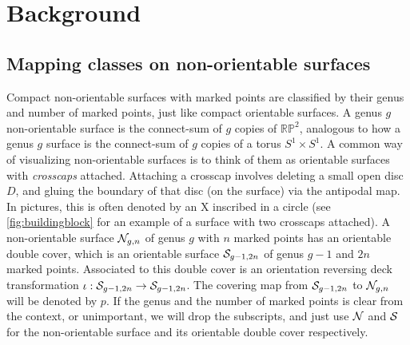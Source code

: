 \section{Background}
\label{sec:background}

\subsection{Mapping classes on non-orientable surfaces}
\label{sec:mapping-classes-non}

Compact non-orientable surfaces with marked points are classified by their genus and number of marked points,
just like compact orientable surfaces. A genus $g$ non-orientable surface is the connect-sum of $g$ copies of
$\mathbb{RP}^2$, analogous to how a genus $g$ surface is the connect-sum of $g$ copies of a torus
$S^1 \times S^1$.  A common way of visualizing non-orientable surfaces is to think of them as orientable
surfaces with \emph{crosscaps} attached. Attaching a crosscap involves deleting a small open disc $D$, and
gluing the boundary of that disc (on the surface) via the antipodal map. In pictures, this is often denoted by
an X inscribed in a circle (see \autoref{fig:buildingblock} for an example of a surface with two crosscaps
attached).  A non-orientable surface $\mathcal{N}_{g,n}$ of genus $g$ with $n$ marked points has an orientable double
cover, which is an orientable surface $\mathcal{S}_{g-1, 2n}$ of genus $g-1$ and $2n$ marked points. Associated to
this double cover is an orientation reversing deck transformation $\iota: \mathcal{S}_{g-1, 2n} \to \mathcal{S}_{g-1,
  2n}$. The covering map from $\mathcal{S}_{g-1,2n}$ to $\mathcal{N}_{g,n}$ will be denoted by $p$. If the genus and the
number of marked points is clear from the context, or unimportant, we will drop the subscripts, and just use
$\mathcal{N}$ and $\mathcal{S}$ for the non-orientable surface and its orientable double cover respectively.

